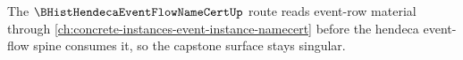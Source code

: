 The $\BHistHendecaEventFlowNameCertUp$ route reads event-row material through \autoref{ch:concrete-instances-event-instance-namecert} before the hendeca event-flow spine consumes it, so the capstone surface stays singular.


